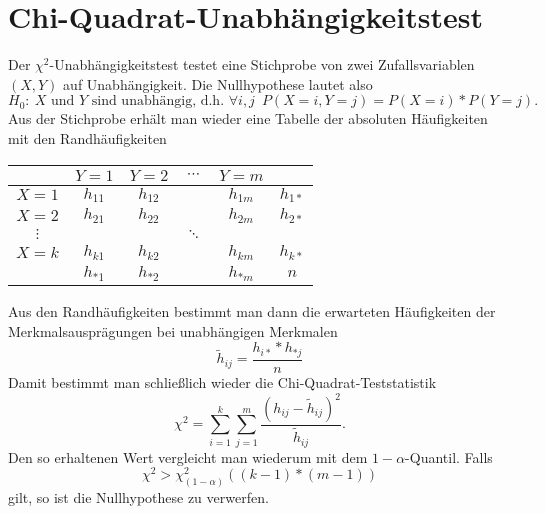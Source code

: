 \section{Chi-Quadrat-Unabhängigkeitstest}
Der $\chi^2$-Unabhängigkeitstest testet eine Stichprobe von zwei Zufallsvariablen $(X,Y)$ auf Unabhängigkeit.
Die Nullhypothese lautet also
\begin{equation*}
	H_0:\ X\text{ und }Y\text{ sind unabhängig, d.h. }\forall i,j\enspace P(X=i, Y=j)=P(X=i)*P(Y=j).
\end{equation*}
Aus der Stichprobe erhält man wieder eine Tabelle der absoluten Häufigkeiten mit den Randhäufigkeiten
\begin{center}
	\begin{tabular}{c|cccc|c}
		&$Y=1$&$Y=2$&$\cdots$&$Y=m$&\\\hline
		$X=1$&$h_{11}$&$h_{12}$&&$h_{1m}$&$h_{1*}$\\
		$X=2$&$h_{21}$&$h_{22}$&&$h_{2m}$&$h_{2*}$\\
		$\vdots$&&&$\ddots$&\\
		$X=k$&$h_{k1}$&$h_{k2}$&&$h_{km}$&$h_{k*}$\\\hline
		&$h_{*1}$&$h_{*2}$&&$h_{*m}$&$n$
	\end{tabular}
\end{center}
Aus den Randhäufigkeiten bestimmt man dann die erwarteten Häufigkeiten der Merkmalsausprägungen bei unabhängigen Merkmalen
\begin{equation*}
	\tilde h_{ij}=\frac{h_{i*}*h_{*j}}{n}
\end{equation*}
Damit bestimmt man schließlich wieder die Chi-Quadrat-Teststatistik
\begin{equation*}
	\chi^2=\sum_{i=1}^k \sum_{j=1}^m \frac{(h_{ij}-\tilde h_{ij})^2}{\tilde h_{ij}}.
\end{equation*}
Den so erhaltenen Wert vergleicht man wiederum mit dem $1-\alpha$-Quantil. Falls
\begin{equation*}
	\chi^2 > \chi^2_{(1-\alpha)}((k-1)*(m-1))
\end{equation*}
gilt, so ist die Nullhypothese zu verwerfen.